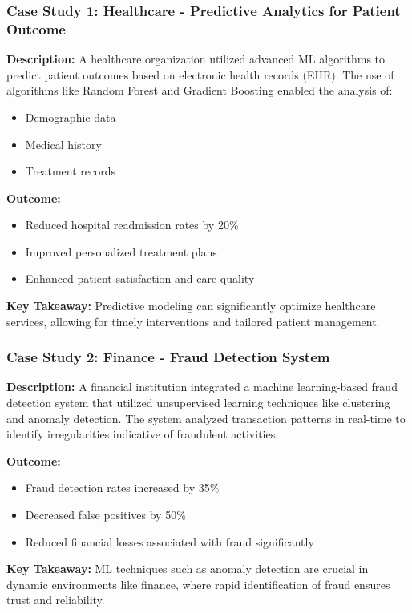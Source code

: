 \documentclass[aspectratio=169]{beamer}
\begin{document}
\begin{frame}[fragile]
    \frametitle{Case Study 1: Healthcare - Predictive Analytics for Patient Outcome}
    
    \textbf{Description:}  
    A healthcare organization utilized advanced ML algorithms to predict patient outcomes based on electronic health records (EHR). The use of algorithms like Random Forest and Gradient Boosting enabled the analysis of:
    
    \begin{itemize}
        \item Demographic data
        \item Medical history
        \item Treatment records
    \end{itemize}
    
    \textbf{Outcome:}
    \begin{itemize}
        \item Reduced hospital readmission rates by 20\%
        \item Improved personalized treatment plans
        \item Enhanced patient satisfaction and care quality
    \end{itemize}

    \textbf{Key Takeaway:}  
    Predictive modeling can significantly optimize healthcare services, allowing for timely interventions and tailored patient management.
\end{frame}

\begin{frame}[fragile]
    \frametitle{Case Study 2: Finance - Fraud Detection System}
    
    \textbf{Description:}  
    A financial institution integrated a machine learning-based fraud detection system that utilized unsupervised learning techniques like clustering and anomaly detection. The system analyzed transaction patterns in real-time to identify irregularities indicative of fraudulent activities.
    
    \textbf{Outcome:}
    \begin{itemize}
        \item Fraud detection rates increased by 35\%
        \item Decreased false positives by 50\%
        \item Reduced financial losses associated with fraud significantly
    \end{itemize}
    
    \textbf{Key Takeaway:}  
    ML techniques such as anomaly detection are crucial in dynamic environments like finance, where rapid identification of fraud ensures trust and reliability.
\end{frame}
\end{document}
